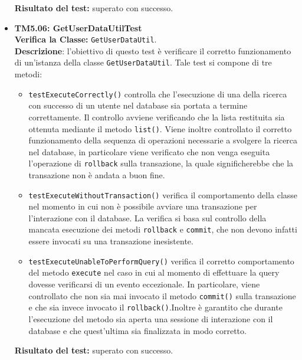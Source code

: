 \begin{itemize}
\begin{itemize}
\end{itemize}
\textbf{Risultato del test:} superato con successo.


\item \textbf{TM5.06: GetUserDataUtilTest}\\
\textbf{Verifica la Classe:} \texttt{GetUserDataUtil}.\\
\textbf{Descrizione}: l'obiettivo di questo test è verificare il corretto funzionamento di un'istanza della classe \texttt{GetUserDataUtil}.
Tale test si compone di tre metodi:
\begin{itemize}
\item \texttt{testExecuteCorrectly()} controlla che l'esecuzione di una della ricerca con successo di un utente nel database sia portata a termine correttamente. 
Il controllo avviene verificando che la lista restituita sia ottenuta mediante il metodo \texttt{list()}. 
Viene inoltre controllato il corretto funzionamento della sequenza di operazioni necessarie a svolgere la ricerca nel database, in particolare viene verificato che non venga eseguita l'operazione di \texttt{rollback} sulla transazione, la quale significherebbe che la transazione non è andata a buon fine.
 
\item \texttt{testExecuteWithoutTransaction()}
verifica il comportamento della classe nel momento in cui non è possibile avviare una transazione per l'interazione con il database.
La verifica si basa sul controllo della mancata esecuzione dei metodi \texttt{rollback} e \texttt{commit}, che non devono infatti essere invocati su una transazione inesistente.

\item \texttt{testExecuteUnableToPerformQuery()} verifica il corretto comportamento del metodo \texttt{execute} nel caso in cui al momento di effettuare la query dovesse verificarsi di un evento eccezionale. In particolare, viene controllato che non sia mai invocato il metodo \texttt{commit()} sulla transazione e che sia invece invocato il \texttt{rollback()}.Inoltre è garantito che durante l'esecuzione del metodo sia aperta una sessione di interazione con il database e che quest'ultima sia finalizzata in modo corretto. 
\end{itemize}
\textbf{Risultato del test:} superato con successo.



\end{itemize}

